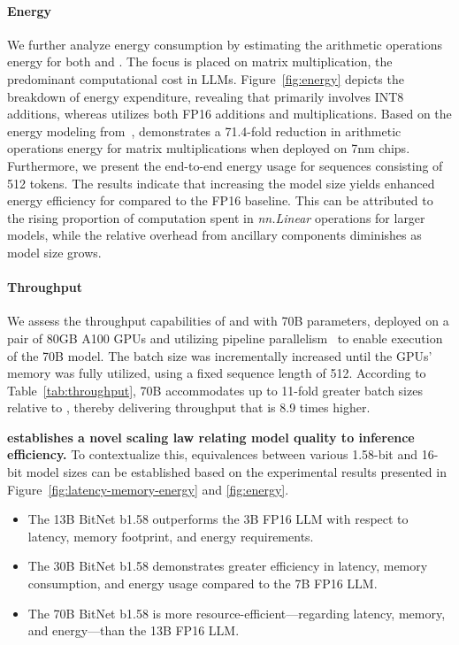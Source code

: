\paragraph{Energy}

We further analyze energy consumption by estimating the arithmetic operations energy for both  and . The focus is placed on matrix multiplication, the predominant computational cost in LLMs. Figure~\ref{fig:energy} depicts the breakdown of energy expenditure, revealing that  primarily involves INT8 additions, whereas  utilizes both FP16 additions and multiplications. Based on the energy modeling from~\cite{energycost, pokebnn},  demonstrates a 71.4-fold reduction in arithmetic operations energy for matrix multiplications when deployed on 7nm chips. Furthermore, we present the end-to-end energy usage for sequences consisting of 512 tokens. The results indicate that increasing the model size yields enhanced energy efficiency for  compared to the FP16  baseline. This can be attributed to the rising proportion of computation spent in \emph{nn.Linear} operations for larger models, while the relative overhead from ancillary components diminishes as model size grows.

\paragraph{Throughput}

We assess the throughput capabilities of  and  with 70B parameters, deployed on a pair of 80GB A100 GPUs and utilizing pipeline parallelism~\cite{gpipe} to enable execution of the  70B model. The batch size was incrementally increased until the GPUs' memory was fully utilized, using a fixed sequence length of 512. According to Table~\ref{tab:throughput},  70B accommodates up to 11-fold greater batch sizes relative to , thereby delivering throughput that is 8.9 times higher.

\textbf{ establishes a novel scaling law relating model quality to inference efficiency.} To contextualize this, equivalences between various 1.58-bit and 16-bit model sizes can be established based on the experimental results presented in Figure~\ref{fig:latency-memory-energy} and \ref{fig:energy}.

\begin{itemize}
    \item The 13B BitNet b1.58 outperforms the 3B FP16 LLM with respect to latency, memory footprint, and energy requirements.
    \item The 30B BitNet b1.58 demonstrates greater efficiency in latency, memory consumption, and energy usage compared to the 7B FP16 LLM.
    \item The 70B BitNet b1.58 is more resource-efficient—regarding latency, memory, and energy—than the 13B FP16 LLM.
\end{itemize}

